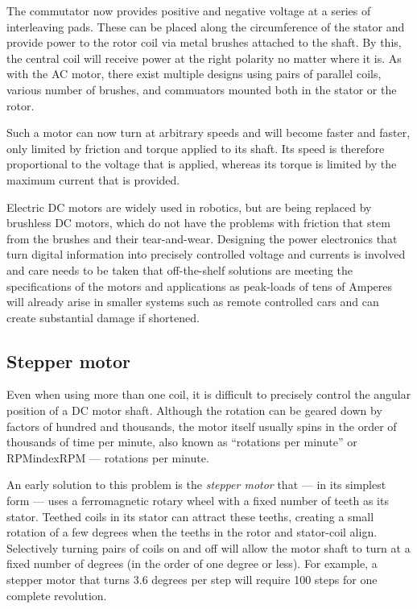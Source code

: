 The commutator now provides positive and negative voltage at a series of interleaving pads. These can be placed along the circumference of the stator and provide power to the rotor coil via metal brushes attached to the shaft. By this, the central coil will receive power at the right polarity no matter where it is. As with the AC motor, there exist multiple designs using pairs of parallel coils, various number of brushes, and commuators mounted both in the stator or the rotor.

Such a motor can now turn at arbitrary speeds and will become faster and faster, only limited by friction and torque applied to its shaft. Its speed is therefore proportional to the voltage that is applied, whereas its torque is limited by the maximum current that is provided. 

Electric DC motors are widely used in robotics, but are being replaced by brushless DC motors, which do not have the problems with friction that stem from the brushes and their tear-and-wear. Designing the power electronics that turn digital information into precisely controlled voltage and currents is involved and care needs to be taken that off-the-shelf solutions are meeting the specifications of the motors and applications as peak-loads of tens of Amperes will already arise in smaller systems such as remote controlled cars and can create substantial damage if shortened. 

\subsection{Stepper motor}
Even when using more than one coil, it is difficult to precisely control the angular position of a DC motor shaft. Although the rotation can be geared down by factors of hundred and thousands, the motor itself usually spins in the order of thousands of time per minute, also known as ``rotations per minute'' or RPMindex{RPM --- rotations per minute}.

An early solution to this problem is the \emph{stepper motor} that --- in its simplest form --- uses a ferromagnetic rotary wheel with a fixed number of teeth as its stator. Teethed coils in its stator can attract these teeths, creating a small rotation of a few degrees when the teeths in the rotor and stator-coil align. Selectively turning pairs of coils on and off will allow the motor shaft to turn at a fixed number of degrees (in the order of one degree or less). For example, a stepper motor that turns 3.6 degrees per step will require 100 steps for one complete revolution.

